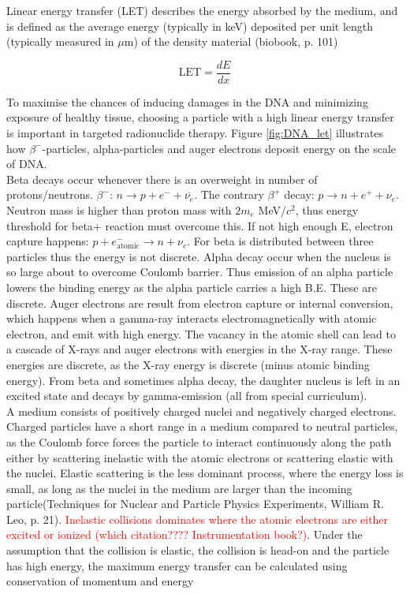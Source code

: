 Linear energy transfer (LET) describes the energy absorbed by the medium, and is defined as the average energy (typically in keV) deposited per unit length (typically measured in $\mu$m) of the density material (biobook, p. 101)

\begin{equation}
    \text{LET}=\frac{dE}{dx}
\end{equation}

To maximise the chances of inducing damages in the DNA and minimizing exposure of healthy tissue, choosing a particle with a high linear energy transfer is important in targeted radionuclide therapy. Figure \ref{fig:DNA_let} illustrates how $\beta^-$-particles, alpha-particles and auger electrons deposit energy on the scale of DNA. \\

Beta decays occur whenever there is an overweight in number of protons/neutrons. $\beta^-$: $n\rightarrow p+e^-+ \overline{\nu_e}$. The contrary $\beta^+$ decay: $p \rightarrow n+e^+ +\nu_e$. Neutron mass is higher than proton mass with $2m_e$ MeV/$c^2$, thus energy threshold for beta+ reaction must overcome this. If not high enough E, electron capture happens: $p+e^-_\text{atomic}\rightarrow n+ \nu_e$. For beta is distributed between three particles thus the energy is not discrete. Alpha decay occur when the nucleus is so large about to overcome Coulomb barrier. Thus emission of an alpha particle lowers the binding energy as the alpha particle carries a high B.E. These are discrete. Auger electrons are result from electron capture or internal conversion, which happens when a gamma-ray interacts electromagnetically with atomic electron, and emit with high energy. The vacancy in the atomic shell can lead to a cascade of X-rays and auger electrons with energies in the X-ray range. These energies are discrete, as the X-ray energy is discrete (minus atomic binding energy). From beta and sometimes alpha decay, the daughter nucleus is left in an excited state and decays by gamma-emission (all from special curriculum).  \\

\noindent A medium consists of positively charged nuclei and negatively charged electrons. Charged particles have a short range in a medium compared to neutral particles, as the Coulomb force forces the particle to interact continuously along the path either by scattering inelastic with the atomic electrons or scattering elastic with the nuclei. Elastic scattering is the less dominant process, where the energy loss is small, as long as the nuclei in the medium are larger than the incoming particle(Techniques for Nuclear and Particle Physics Experiments, William R. Leo, p.  21). \textcolor{red}{Inelastic collisions dominates where the atomic electrons are either excited or ionized (which citation???? Instrumentation book?)}. Under the assumption that the collision is elastic, the collision is head-on and the particle has high energy, the maximum energy transfer can be calculated using conservation of momentum and energy

